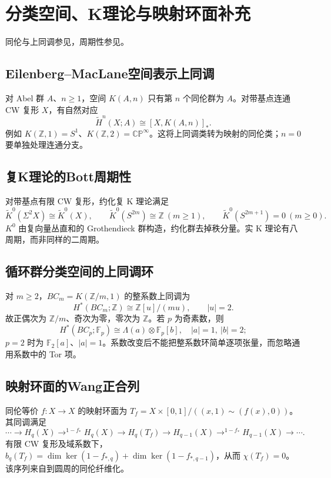\documentclass[../main.tex]{subfiles}
\begin{document}
\section{分类空间、K理论与映射环面补充}
同伦与上同调参见\cite{hatcher}，周期性参见\cite{hatcherK}。
\subsection{Eilenberg--MacLane空间表示上同调}
对 Abel 群 $A$、$n\ge1$，空间 $K(A,n)$ 只有第 $n$ 个同伦群为 $A$。对带基点连通 CW 复形 $X$，有自然对应
\[
\widetilde H^n(X;A)\cong[X,K(A,n)]_*.
\]
例如 $K(\mathbb Z,1)=S^1$、$K(\mathbb Z,2)=\mathbb{CP}^\infty$。这将上同调类转为映射的同伦类；$n=0$ 要单独处理连通分支。
\subsection{复K理论的Bott周期性}
对带基点有限 CW 复形，约化复 K 理论满足
\[
\widetilde K^0(\Sigma^2X)\cong\widetilde K^0(X),\qquad
\widetilde K^0(S^{2m})\cong\mathbb Z\ (m\ge1),\qquad
\widetilde K^0(S^{2m+1})=0\ (m\ge0).
\]
$K^0$ 由复向量丛直和的 Grothendieck 群构造，约化群去掉秩分量。实 K 理论有八周期，而非同样的二周期。
\subsection{循环群分类空间的上同调环}
对 $m\ge2$，$BC_m=K(\mathbb Z/m,1)$ 的整系数上同调为
\[
H^*(BC_m;\mathbb Z)\cong\mathbb Z[u]/(mu),\qquad |u|=2.
\]
故正偶次为 $\mathbb Z/m$、奇次为零，零次为 $\mathbb Z$。若 $p$ 为奇素数，则
\[
H^*(BC_p;\mathbb F_p)\cong\Lambda(a)\otimes\mathbb F_p[b],\quad |a|=1,\ |b|=2;
\]
$p=2$ 时为 $\mathbb F_2[a]$、$|a|=1$。系数改变后不能把整系数环简单逐项张量，而忽略通用系数中的 Tor 项。
\newpage
\subsection{映射环面的Wang正合列}
同伦等价 $f:X\to X$ 的映射环面为 $T_f=X\times[0,1]/((x,1)\sim(f(x),0))$。其同调满足
\[
\cdots\to H_q(X)\mathop{\longrightarrow}^{1-f_*}H_q(X)
\to H_q(T_f)\to H_{q-1}(X)\mathop{\longrightarrow}^{1-f_*}H_{q-1}(X)\to\cdots.
\]
有限 CW 复形及域系数下，$b_q(T_f)=\dim\ker(1-f_{*,q})+\dim\ker(1-f_{*,q-1})$，从而 $\chi(T_f)=0$。该序列来自到圆周的同伦纤维化。
\clearpage
\end{document}
